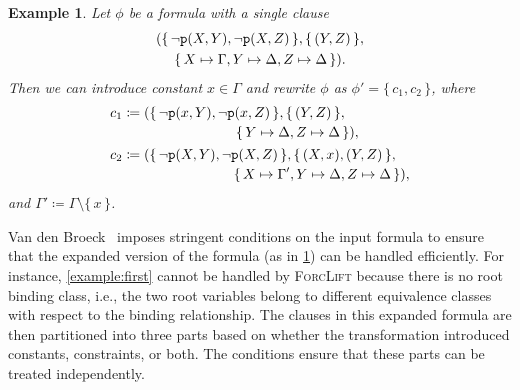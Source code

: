 \documentclass{article}
\newtheorem{example}{Example}
\newcommand{\predicate}{\texttt{\textup{p}}}
\begin{document}
\begin{example}\label{example:dr}
  Let $\phi$ be a formula with a single clause
  \begin{multline*}
    (\{\, \neg \predicate(X, Y), \neg \predicate(X, Z) \,\}, \{\, (Y, Z) \,\}, \\
    \{\, X \mapsto \Gamma, Y \mapsto \Delta, Z \mapsto \Delta \,\}).
  \end{multline*}
  Then we can introduce constant $x \in \Gamma$ and rewrite $\phi$ as
  $\phi' = \{\, c_{1}, c_{2} \,\}$, where
  \begin{align*}
    c_{1} &\coloneqq \begin{multlined}[t]
      (\{\, \neg \predicate(x, Y), \neg \predicate(x, Z) \,\}, \{\, (Y, Z) \,\}, \\
      \{\, Y \mapsto \Delta, Z \mapsto \Delta \,\}),
      \end{multlined}\\
    c_{2} &\coloneqq \begin{multlined}[t]
      (\{\, \neg \predicate(X, Y), \neg \predicate(X, Z) \,\}, \{\, (X, x), (Y, Z) \,\}, \\
      \{\, X \mapsto \Gamma', Y \mapsto \Delta, Z \mapsto \Delta \,\}),
      \end{multlined}
  \end{align*}
  and $\Gamma' \coloneqq \Gamma \setminus \{\, x \,\}$.
\end{example}

Van den Broeck~ imposes stringent conditions
on the input formula to ensure that the expanded version of the formula (as in
\cref{example:dr}) can be handled efficiently. For instance,
\cref{example:first} cannot be handled by \textsc{ForcLift} because there is no
root binding class, i.e., the two root variables belong to different equivalence
classes with respect to the binding relationship. The clauses in this expanded
formula are then partitioned into three parts based on whether the
transformation introduced constants, constraints, or both. The conditions ensure
that these parts can be treated independently.
\end{document}

